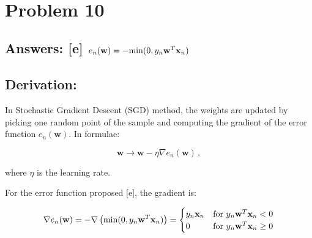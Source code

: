 \documentclass[11pt]{article}
\begin{document}
    \begin{center}
    \end{center}
    { \hspace*{\fill} \\}
    
    \hypertarget{problem-10}{%
\section{Problem 10}\label{problem-10}}

\hypertarget{answers-e-e_nmathbfw-rm-min0y_nmathbfwtmathbfx_n}{%
\subsection{\texorpdfstring{Answers: {[}e{]}
\(e_n(\mathbf{w})=-{\rm min}(0,y_n\mathbf{w}^T\mathbf{x}_n)\)}{Answers: {[}e{]} e\_n(\textbackslash{}mathbf\{w\})=-\{\textbackslash{}rm min\}(0,y\_n\textbackslash{}mathbf\{w\}\^{}T\textbackslash{}mathbf\{x\}\_n)}}\label{answers-e-e_nmathbfw-rm-min0y_nmathbfwtmathbfx_n}}

\hypertarget{derivation}{%
\subsection{Derivation:}\label{derivation}}

In Stochastic Gradient Descent (SGD) method, the weights are updated by
picking one random point of the sample and computing the gradient of the
error function \(e_n(\mathbf{w})\). In formulae:

\begin{equation}
\mathbf{w}\rightarrow \mathbf{w}-\eta \nabla e_n(\mathbf{w})\,,
\end{equation}

where \(\eta\) is the learning rate.

For the error function proposed {[}e{]}, the gradient is:

\begin{equation}
 \nabla e_n(\mathbf{w})= -\nabla \left({\rm min}(0,y_n\mathbf{w}^T\mathbf{x}_n)\right)=
\begin{cases}
y_n\mathbf{x}_n & \text{for } y_n\mathbf{w}^T\mathbf{x}_n < 0\\
0  & \text{for } y_n\mathbf{w}^T\mathbf{x}_n \ge 0
\end{cases}
\end{equation}
\end{document}
